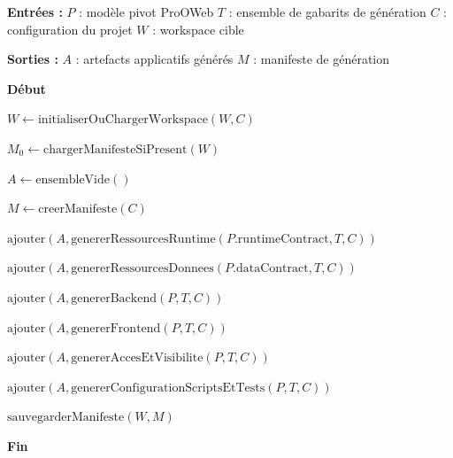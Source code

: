 \begin{algorithm}[H]
\footnotesize
\DontPrintSemicolon
\SetAlgoLined
{}
\SetInd{0.4em}{0.8em}

\caption{TransformationM2T($P,T,C,W$)}
\label{alg:m2t}

\textbf{Entrées :}\;
\Indp
$P$ : modèle pivot ProOWeb\;
$T$ : ensemble de gabarits de génération\;
$C$ : configuration du projet\;
$W$ : workspace cible\;
\Indm

\textbf{Sorties :}\;
\Indp
$A$ : artefacts applicatifs générés\;
$M$ : manifeste de génération\;
\Indm

\textbf{Début}\;

$W \leftarrow \mathrm{initialiserOuChargerWorkspace}(W,C)$\;

$M_0 \leftarrow \mathrm{chargerManifesteSiPresent}(W)$\;

$A \leftarrow \mathrm{ensembleVide}()$\;

$M \leftarrow \mathrm{creerManifeste}(C)$\;

$\mathrm{ajouter}(A,
\mathrm{genererRessourcesRuntime}(P.\mathrm{runtimeContract},T,C))$\;

$\mathrm{ajouter}(A,
\mathrm{genererRessourcesDonnees}(P.\mathrm{dataContract},T,C))$\;

$\mathrm{ajouter}(A,\mathrm{genererBackend}(P,T,C))$\;

$\mathrm{ajouter}(A,\mathrm{genererFrontend}(P,T,C))$\;

$\mathrm{ajouter}(A,\mathrm{genererAccesEtVisibilite}(P,T,C))$\;

$\mathrm{ajouter}(A,\mathrm{genererConfigurationScriptsEtTests}(P,T,C))$\;


$\mathrm{sauvegarderManifeste}(W,M)$\;

\;

\textbf{Fin}
\end{algorithm}

